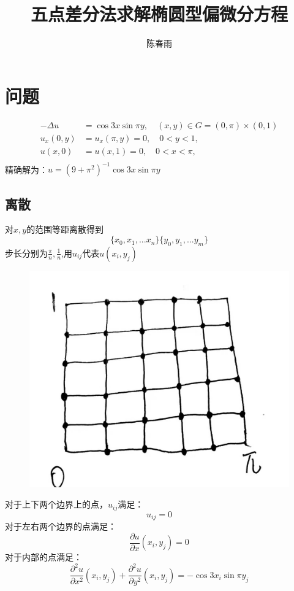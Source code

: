 \documentclass[12pt,a4paper]{article}
\title{ 五点差分法求解椭圆型偏微分方程}
\author{ 陈春雨}
\date{\chntoday}
\begin{document}
\maketitle
\newpage
\section{问题}

\begin{align*}
-\Delta u &=\cos3x\sin\pi y,\quad (x,y)\in G=(0,\pi)\times(0,1) \\
u_x(0,y) &=u_x(\pi,y)=0,\quad 0<y<1,\\
u(x,0) &=u(x,1)=0,\quad 0<x<\pi,\\
\end{align*}
精确解为：$u=(9+\pi^2)^{-1}\cos3x\sin\pi y$
\subsection{ 离散}
对$x,y$的范围等距离散得到
$$
\{x_0,x_1,...x_n\}
\{y_0,y_1,...y_m\}
$$
步长分别为$\frac{\pi}{n},\frac{1}{n}$,用$u_{ij}$代表$u(x_i,y_j)$
\begin{figure}[H]
\centering
\includegraphics[scale=0.15]{./figures/Figure_1.jpg}
\end{figure}

对于上下两个边界上的点，$u_{ij}$满足：
$$
u_{ij}=0
$$
对于左右两个边界的点满足：
\begin{equation}
\frac{\partial u}{\partial x} (x_i,y_j)=0
\end{equation}
对于内部的点满足：
\begin{equation}\frac{\partial^2 u}{\partial x^2}(x_i,y_j)+\frac{\partial^2 u}{\partial y^2}(x_i,y_j)=-\cos3x_i\sin\pi y_j
\end{equation}
\end{document}

